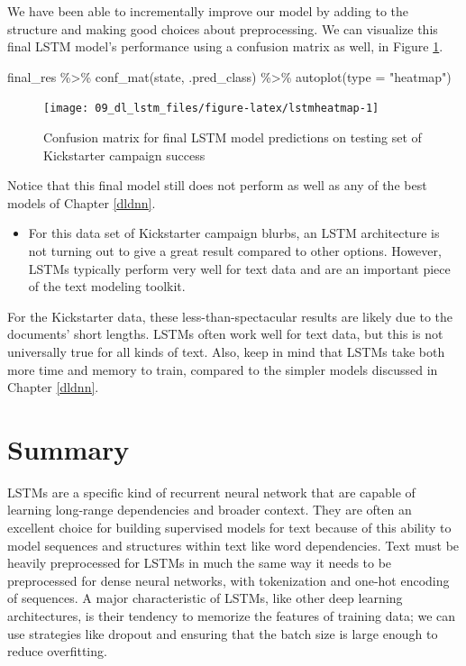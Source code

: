 \documentclass[
]{krantz}
\makeatletter
\newenvironment{Shaded}{\begin{snugshade}}{\end{snugshade}}
\newcommand{\AttributeTok}[1]{\textcolor[rgb]{0.77,0.63,0.00}{#1}}
\newcommand{\FunctionTok}[1]{\textcolor[rgb]{0.00,0.00,0.00}{#1}}
\newcommand{\NormalTok}[1]{#1}
\newcommand{\SpecialCharTok}[1]{\textcolor[rgb]{0.00,0.00,0.00}{#1}}
\newcommand{\StringTok}[1]{\textcolor[rgb]{0.31,0.60,0.02}{#1}}
\newenvironment{kframe}{%
\medskip{}
\setlength{\fboxsep}{.8em}
 \def\at@end@of@kframe{}%
 \ifinner\ifhmode%
  \def\at@end@of@kframe{\end{minipage}}%
  \begin{minipage}{\columnwidth}%
 \fi\fi%
 \def\FrameCommand##1{\hskip\@totalleftmargin \hskip-\fboxsep
 \colorbox{shadecolor}{##1}\hskip-\fboxsep
     \hskip-\linewidth \hskip-\@totalleftmargin \hskip\columnwidth}%
 \MakeFramed {\advance\hsize-\width
   \@totalleftmargin\z@ \linewidth\hsize
   \@setminipage}}%
 {\par\unskip\endMakeFramed%
 \at@end@of@kframe}
\renewenvironment{Shaded}{\begin{kframe}}{\end{kframe}}
\newenvironment{rmdblock}[1]
  {\begin{shaded*}
  \begin{itemize}[left = -1cm, labelsep = 1cm]
  \renewcommand{\labelitemi}{
    \raisebox{-.7\height}[0pt][0pt]{
      {\setkeys{Gin}{width=3em,keepaspectratio}\texttt{[image: images/\#1]}}
    }
  }
 
  \item
  }
  {
  \end{itemize}
  \end{shaded*}
  }
\newenvironment{rmdnote}
  {\begin{rmdblock}{note}}
  {\end{rmdblock}}
\makeatother
\begin{document}
We have been able to incrementally improve our model by adding to the structure and making good choices about preprocessing. We can visualize this final LSTM model's performance using a confusion matrix as well, in Figure \ref{fig:lstmheatmap}.

\begin{Shaded}
\begin{Highlighting}[]
\NormalTok{final\_res }\SpecialCharTok{\%\textgreater{}\%}
  \FunctionTok{conf\_mat}\NormalTok{(state, .pred\_class) }\SpecialCharTok{\%\textgreater{}\%}
  \FunctionTok{autoplot}\NormalTok{(}\AttributeTok{type =} \StringTok{"heatmap"}\NormalTok{)}
\end{Highlighting}
\end{Shaded}

\begin{figure}

{\centering \texttt{[image: 09\_dl\_lstm\_files/figure-latex/lstmheatmap-1]} 

}

\caption{Confusion matrix for final LSTM model predictions on testing set of Kickstarter campaign success}\label{fig:lstmheatmap}
\end{figure}

Notice that this final model still does not perform as well as any of the best models of Chapter \ref{dldnn}.

\begin{rmdnote}
For this data set of Kickstarter campaign blurbs, an LSTM architecture
is not turning out to give a great result compared to other options.
However, LSTMs typically perform very well for text data and are an
important piece of the text modeling toolkit.
\end{rmdnote}

For the Kickstarter data, these less-than-spectacular results are likely due to the documents' short lengths. LSTMs often work well for text data, but this is not universally true for all kinds of text. Also, keep in mind that LSTMs take both more time and memory to train, compared to the simpler models discussed in Chapter \ref{dldnn}.

\hypertarget{dllstmsummary}{%
\section{Summary}\label{dllstmsummary}}

LSTMs are a specific kind of recurrent neural network that are capable of learning long-range dependencies and broader context. They are often an excellent choice for building supervised models for text because of this ability to model sequences and structures within text like word dependencies. Text must be heavily preprocessed for LSTMs in much the same way it needs to be preprocessed for dense neural networks, with tokenization and one-hot encoding of sequences. A major characteristic of LSTMs, like other deep learning architectures, is their tendency to memorize the features of training data; we can use strategies like dropout and ensuring that the batch size is large enough to reduce overfitting.
\end{document}
